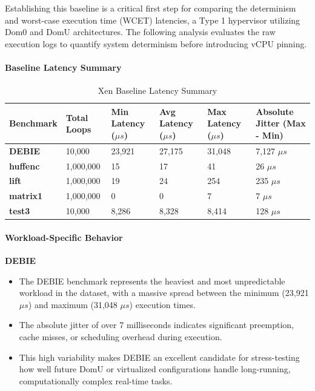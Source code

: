 Establishing this baseline is a critical first step for comparing the
determinism and worst-case execution time (WCET) latencies, a Type 1
hypervisor utilizing Dom0 and DomU architectures. The following analysis
evaluates the raw execution logs to quantify system determinism before
introducing vCPU pinning.

\paragraph{Baseline Latency Summary}\label{baseline-latency-summary-1}

\begin{table}
\centering
\caption{Xen Baseline Latency Summary}
\label{tab:xen:baseline}
\begin{tabularx}{\linewidth}{@{}YYYYYY@{}}
\toprule
Benchmark & Total Loops & Min Latency ($\mu s$) & Avg Latency ($\mu s$) & Max Latency ($\mu s$) & Absolute Jitter (Max - Min)\tabularnewline
\midrule
\textbf{DEBIE} & 10,000 & 23,921 & 27,175 & 31,048 & 7,127 $\mu s$\tabularnewline
\textbf{huffenc} & 1,000,000 & 15 & 17 & 41 & 26 $\mu s$\tabularnewline
\textbf{lift} & 1,000,000 & 19 & 24 & 254 & 235 $\mu s$\tabularnewline
\textbf{matrix1} & 1,000,000 & 0 & 0 & 7 & 7 $\mu s$\tabularnewline
\textbf{test3} & 10,000 & 8,286 & 8,328 & 8,414 & 128 $\mu s$\tabularnewline
\bottomrule
\end{tabularx}
\end{table}

\paragraph{Workload-Specific
Behavior}\label{workload-specific-behavior-4}

\textbf{DEBIE}

\begin{itemize}
\item
  The DEBIE benchmark represents the heaviest and most unpredictable
  workload in the dataset, with a massive spread between the minimum
  (23,921 $\mu s$) and maximum (31,048 $\mu s$) execution times.
\item
  The absolute jitter of over 7 milliseconds indicates significant
  preemption, cache misses, or scheduling overhead during execution.
\item
  This high variability makes DEBIE an excellent candidate for
  stress-testing how well future DomU or virtualized configurations
  handle long-running, computationally complex real-time tasks.
\end{itemize}

